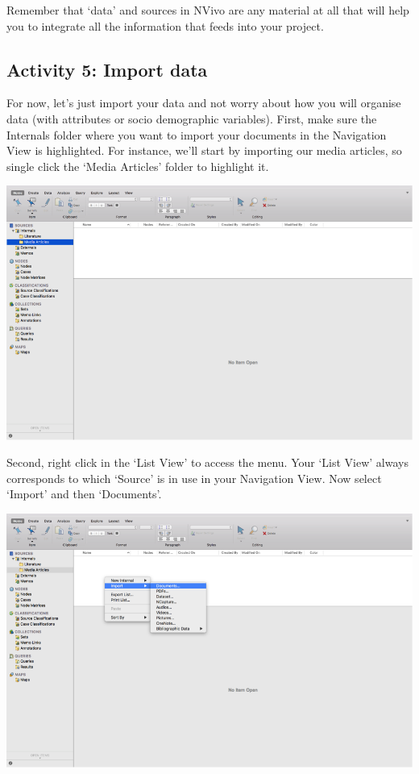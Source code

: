 \documentclass[]{book}
\theoremstyle{definition}
\theoremstyle{definition}
\theoremstyle{definition}
\theoremstyle{remark}
\begin{document}
Remember that `data' and sources in NVivo are any material at all that
will help you to integrate all the information that feeds into your
project.

\hypertarget{activity-5-import-data}{%
\subsection{Activity 5: Import data}\label{activity-5-import-data}}

For now, let's just import your data and not worry about how you will
organise data (with attributes or socio demographic variables). First,
make sure the Internals folder where you want to import your documents
in the Navigation View is highlighted. For instance, we'll start by
importing our media articles, so single click the `Media Articles'
folder to highlight it.

\includegraphics{imgs/qual_13.png}

Second, right click in the `List View' to access the menu. Your `List
View' always corresponds to which `Source' is in use in your Navigation
View. Now select `Import' and then `Documents'.

\includegraphics{imgs/qual_14.png}
\end{document}
